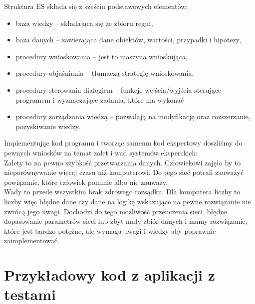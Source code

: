 \documentclass[12pt,a4paper]{article}
\begin{document}
	Struktura ES składa się z sześciu podstawowych elementów:
	\begin{itemize}
		\item baza wiedzy -- składająca się ze zbioru reguł,
		\item baza danych -- zawierająca dane obiektów, wartości, przypadki i hipotezy,
		\item procedury wnioskowania -- jest to maszyna wnioskująca,
		\item procedury objaśniania -- tłumaczą strategię wnioskowania,
		\item procedury sterowania dialogiem -- funkcje wejścia/wyjścia sterujące programem i wyznaczające zadania, które ma wykonać
		\item procedury zarządzania wiedzą -- pozwalają na modyfikację oraz rozszerzanie, pozyskiwanie wiedzy.
	\end{itemize}
	
	
	
	
	Implementując kod programu i tworząc samemu kod ekspertowy doszliśmy do pewnych wniosków na temat zalet i wad systemów eksperckich:\\
	Zalety to na pewno szybkość przetwarzania danych. Człowiekowi zajęło by to nieporównywanie więcej czasu niż komputerowi. Do tego sieć potrafi zauważyć powiązanie, które człowiek pominie albo nie zauważy.\\
	Wady to przede wszystkim brak zdrowego rozsądku. Dla komputera liczby to liczby więc błędne dane czy dane na logikę wskazujące na pewne rozwiązanie nie zwrócą jego uwagi. Dochodzi do tego możliwość przeuczenia sieci, błędne dopasowanie parametrów sieci lub zbyt mały zbiór danych i mamy rozwiązanie, które jest bardzo potężne, ale wymaga uwagi i wiedzy aby poprawnie zaimplementować.
	
	

\section*{Przykładowy kod z aplikacji z testami}
\end{document}
